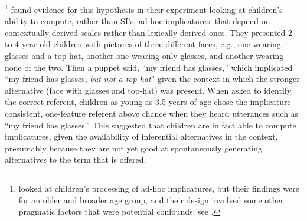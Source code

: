 \documentclass[10pt,letterpaper]{article}
\begin{document}
\footnote{ looked at children's processing of ad-hoc implicatures, but their findings were for an older and broader age group, and their design involved some other pragmatic factors that were potential confounds; see .} found evidence for this hypothesis in their experiment looking at children's ability to compute, rather than SI's, ad-hoc implicatures, that depend on contextually-derived scales rather than lexically-derived ones. They presented 2- to 4-year-old children with pictures of three different faces, e.g., one wearing glasses and a top hat, another one wearing only glasses, and another wearing none of the two. Then a puppet said, ``my friend has glasses,'' which implicated ``my friend has glasses, \emph{but not a top-hat}'' given the context in which the stronger alternative (face with glasses and top-hat) was present. When asked to identify the correct referent, children as young as 3.5 years of age chose the implicature-consistent, one-feature referent above chance when they heard utterances such as ``my friend has glasses.'' This suggested that children are in fact able to compute implicatures, given the availability of inferential alternatives in the context, presumably because they are not yet good at spontaneously generating alternatives to the term that is offered. 


\end{document}
